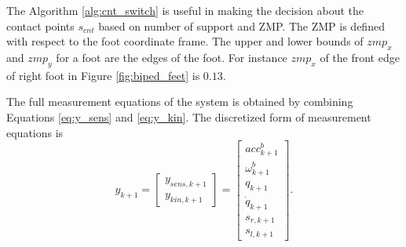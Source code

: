The Algorithm \ref{alg:cnt_switch} is useful in making the decision about the contact points $s_{cnt}$ based on number of support and ZMP. The ZMP is defined with respect to the foot coordinate frame. The upper and lower bounds of ${zmp}_x$ and ${zmp}_y$ for a foot are the edges of the foot. For instance ${zmp}_x$ of the front edge of right foot in Figure \ref{fig:biped_feet} is $0.13$.

The full measurement equations of the system is obtained by combining Equations \ref{eq:y_sens} and \ref{eq:y_kin}. The discretized form of measurement equations is
\begin{equation}
    \label{eq:y_msr}
    y_{k+1} = \begin{bmatrix} y_{sens,k+1} \\ y_{kin,k+1} \end{bmatrix}= \begin{bmatrix} acc^b_{k+1} \\ \omega^b_{k+1} \\ q_{k+1} \\ \dot q_{k+1} \\ s_{r,k+1} \\ s_{l,k+1} \end{bmatrix}.
\end{equation}

